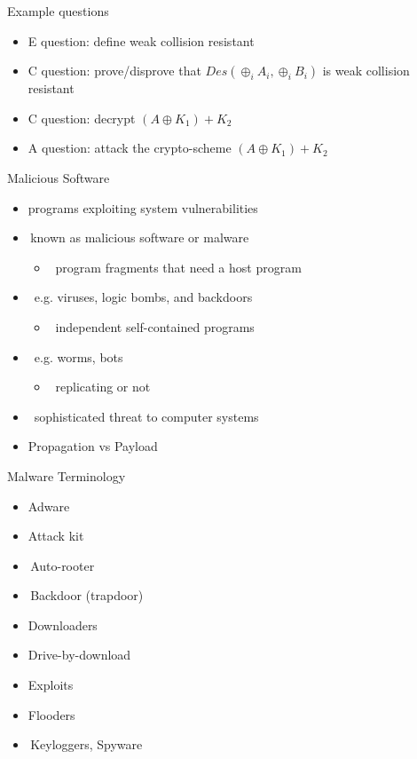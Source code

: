 \documentclass{beamer}
\begin{document}
\begin{frame}{Example questions}
  \begin{itemize}
  \item E question: define weak collision resistant
  \item C question: prove/disprove that $Des(\oplus_i A_i, \oplus_i B_i)$
    is weak collision resistant
  \item C question: decrypt $(A \oplus K_1) + K_2$
  \item A question: attack the crypto-scheme $(A \oplus K_1) + K_2$
  \end{itemize}
\end{frame}

\begin{frame}{Malicious Software}
  \begin{itemize}
  \item programs exploiting system vulnerabilities 
  \item known as malicious software or malware 
    \begin{itemize}
    \item  program fragments that need a host program  
    \end{itemize}
  \item  e.g. viruses, logic bombs, and backdoors 
    \begin{itemize}
    \item  independent self-contained programs 
    \end{itemize}
  \item  e.g. worms, bots 
    \begin{itemize}
    \item  replicating or not 
    \end{itemize}
  \item  sophisticated threat to computer systems
  \item Propagation vs Payload
  \end{itemize}
\end{frame}


\begin{frame}{Malware Terminology}
  \begin{itemize}
    \item Adware
    \item Attack kit
    \item Auto-rooter
    \item Backdoor (trapdoor)‏
    \item Downloaders
    \item Drive-by-download
    \item Exploits
    \item Flooders
    \item Keyloggers, Spyware
  \end{itemize}
\end{frame}
 
\end{document}
